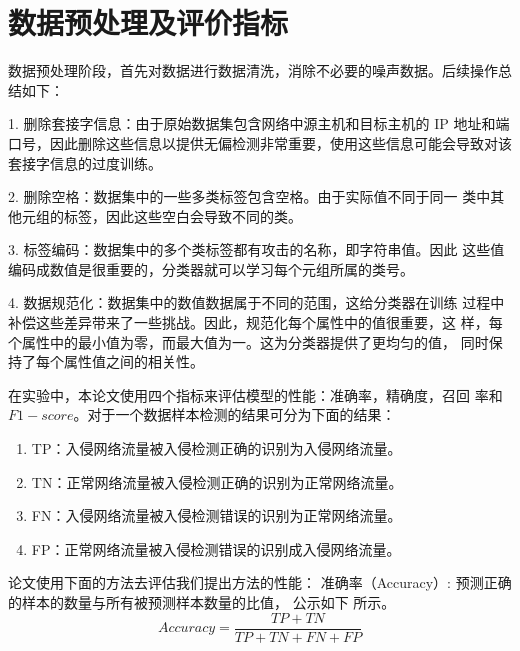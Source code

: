 \section{数据预处理及评价指标}
数据预处理阶段，首先对数据进行数据清洗，消除不必要的噪声数据。后续操作总结如下：

1. 删除套接字信息：由于原始数据集包含网络中源主机和目标主机的 IP 地址和端口号，因此删除这些信息以提供无偏检测非常重要，使用这些信息可能会导致对该套接字信息的过度训练。

2. 删除空格：数据集中的一些多类标签包含空格。由于实际值不同于同一
类中其他元组的标签，因此这些空白会导致不同的类。

3. 标签编码：数据集中的多个类标签都有攻击的名称，即字符串值。因此
这些值编码成数值是很重要的，分类器就可以学习每个元组所属的类号。

4. 数据规范化：数据集中的数值数据属于不同的范围，这给分类器在训练
过程中补偿这些差异带来了一些挑战。因此，规范化每个属性中的值很重要，这
样，每个属性中的最小值为零，而最大值为一。这为分类器提供了更均匀的值，
同时保持了每个属性值之间的相关性。

在实验中，本论文使用四个指标来评估模型的性能：准确率，精确度，召回
率和 $F1-score$。对于一个数据样本检测的结果可分为下面的结果：

\begin{enumerate}
    \item TP：入侵网络流量被入侵检测正确的识别为入侵网络流量。
    \item TN：正常网络流量被入侵检测正确的识别为正常网络流量。
    \item FN：入侵网络流量被入侵检测错误的识别为正常网络流量。
    \item FP：正常网络流量被入侵检测错误的识别成入侵网络流量。
\end{enumerate}





论文使用下面的方法去评估我们提出方法的性能：
准确率（Accuracy）: 预测正确的样本的数量与所有被预测样本数量的比值，
公示如下 所示。
\begin{equation}
    Accuracy = \frac{TP + TN}{TP + TN + FN + FP}
\end{equation}

